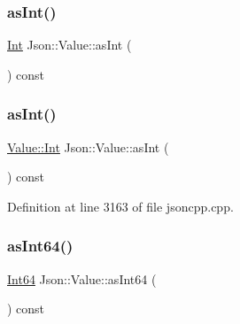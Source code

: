\hypertarget{class_json_1_1_value_a84b5e68092217af6b7fc6d256ef232c1}{}\label{class_json_1_1_value_a84b5e68092217af6b7fc6d256ef232c1} 
\subsubsection{\texorpdfstring{as\+Int()}{asInt()}\hspace{0.1cm}{\footnotesize\ttfamily [1/2]}}
{\footnotesize\ttfamily \hyperlink{class_json_1_1_value_abdf7a7ff73eb130ffcab28504ffdb405}{Int} Json\+::\+Value\+::as\+Int (\begin{DoxyParamCaption}{ }\end{DoxyParamCaption}) const}

\hypertarget{class_json_1_1_value_a614d635bc248a592593feb322cd15ab8}{}\label{class_json_1_1_value_a614d635bc248a592593feb322cd15ab8} 
\subsubsection{\texorpdfstring{as\+Int()}{asInt()}\hspace{0.1cm}{\footnotesize\ttfamily [2/2]}}
{\footnotesize\ttfamily \hyperlink{class_json_1_1_value_abdf7a7ff73eb130ffcab28504ffdb405}{Value\+::\+Int} Json\+::\+Value\+::as\+Int (\begin{DoxyParamCaption}{ }\end{DoxyParamCaption}) const}



Definition at line 3163 of file jsoncpp.\+cpp.

\hypertarget{class_json_1_1_value_af7371262e51d5c564908f5aa684516d1}{}\label{class_json_1_1_value_af7371262e51d5c564908f5aa684516d1} 
\subsubsection{\texorpdfstring{as\+Int64()}{asInt64()}\hspace{0.1cm}{\footnotesize\ttfamily [1/2]}}
{\footnotesize\ttfamily \hyperlink{class_json_1_1_value_a1b86af9f85f0f1baa972c3319fa22695}{Int64} Json\+::\+Value\+::as\+Int64 (\begin{DoxyParamCaption}{ }\end{DoxyParamCaption}) const}

